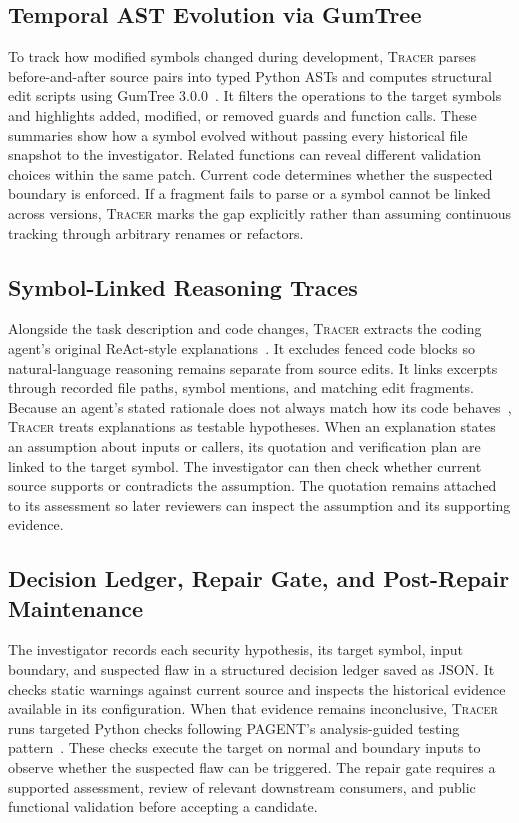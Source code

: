 \documentclass[10pt,conference]{IEEEtran}
\newcommand{\tracer}{\textsc{Tracer}}
\begin{document}
\subsection{Temporal AST Evolution via GumTree}
To track how modified symbols changed during development, \tracer{} parses before-and-after source pairs into typed Python ASTs and computes structural edit scripts using GumTree 3.0.0~\cite{gumtree,gumtree3}. It filters the operations to the target symbols and highlights added, modified, or removed guards and function calls. These summaries show how a symbol evolved without passing every historical file snapshot to the investigator. Related functions can reveal different validation choices within the same patch. Current code determines whether the suspected boundary is enforced. If a fragment fails to parse or a symbol cannot be linked across versions, \tracer{} marks the gap explicitly rather than assuming continuous tracking through arbitrary renames or refactors.

\subsection{Symbol-Linked Reasoning Traces}
Alongside the task description and code changes, \tracer{} extracts the coding agent's original ReAct-style explanations~\cite{react}. It excludes fenced code blocks so natural-language reasoning remains separate from source edits. It links excerpts through recorded file paths, symbol mentions, and matching edit fragments. Because an agent's stated rationale does not always match how its code behaves~\cite{turpin,lanham}, \tracer{} treats explanations as testable hypotheses. When an explanation states an assumption about inputs or callers, its quotation and verification plan are linked to the target symbol. The investigator can then check whether current source supports or contradicts the assumption. The quotation remains attached to its assessment so later reviewers can inspect the assumption and its supporting evidence.

\subsection{Decision Ledger, Repair Gate, and Post-Repair Maintenance}
The investigator records each security hypothesis, its target symbol, input boundary, and suspected flaw in a structured decision ledger saved as JSON. It checks static warnings against current source and inspects the historical evidence available in its configuration. When that evidence remains inconclusive, \tracer{} runs targeted Python checks following PAGENT's analysis-guided testing pattern~\cite{pagent}. These checks execute the target on normal and boundary inputs to observe whether the suspected flaw can be triggered. The repair gate requires a supported assessment, review of relevant downstream consumers, and public functional validation before accepting a candidate.
\end{document}
